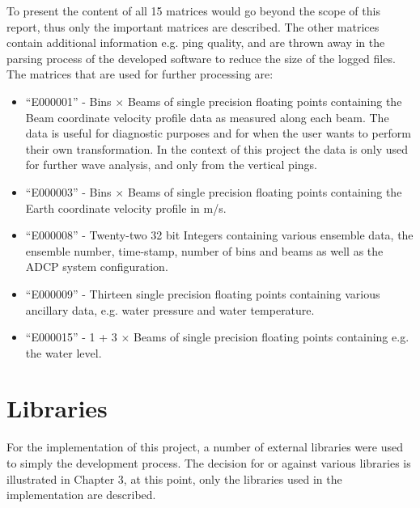 To present the content of all 15 matrices would go beyond the scope of this report, thus only the important matrices are described. The other matrices contain additional information e.g. ping quality, and are thrown away in the parsing process of the developed software to reduce the size of the logged files.\\
The matrices that are used for further processing are:
\begin{itemize}
\item ``E000001'' - Bins $\times$ Beams of single precision floating points containing  the Beam coordinate velocity profile data as measured along each beam. The data is useful for diagnostic purposes and for when the user wants to perform their own transformation. In the context of this project the data is only used for further wave analysis, and only from the vertical pings.
\item``E000003'' - Bins $\times$ Beams of single precision floating points containing the Earth coordinate velocity profile in m/s. 
\item ``E000008'' - Twenty-two 32 bit Integers containing various ensemble data, the ensemble number, time-stamp, number of bins and beams as well as the ADCP system configuration.
\item ``E000009'' - Thirteen single precision floating points containing various ancillary data, e.g. water pressure and water temperature.
\item ``E000015'' - 1 + 3 $\times$ Beams of single precision floating points containing e.g. the water level. 
\end{itemize}

\section{Libraries}
For the implementation of this project, a number of external libraries were used to simply the development process. The decision for or against various libraries is illustrated in Chapter 3, at this point, only the libraries used in the implementation are described.
